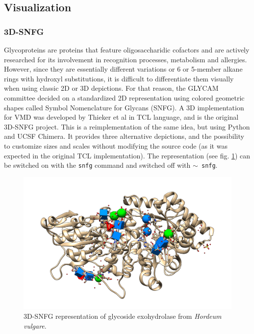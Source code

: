 \subsection{Visualization}
\subsubsection{3D-SNFG}
Glycoproteins are proteins that feature oligosaccharidic cofactors and are actively researched for its involvement in recognition processes, metabolism and allergies. However, since they are essentially different variations or 6 or 5-member alkane rings with hydroxyl  substitutions, it is difficult to differentiate them visually when using classic 2D or 3D depictions. For that reason, the GLYCAM committee decided on a standardized 2D representation using colored geometric shapes called Symbol Nomenclature for Glycans (SNFG).\cite{snfg} A 3D implementation for VMD was developed by Thieker et al\cite{3dsnfg} in TCL language, and is the original 3D-SNFG project. This is a reimplementation of the same idea, but using Python and UCSF Chimera. It provides three alternative depictions, and the possibility to customize sizes and scales without modifying the source code (as it was expected in the original TCL implementation). The representation (see fig. \ref{fig:tangram-snfg}) can be switched on with the \texttt{snfg} command and switched off with \texttt{$ \sim $ snfg}.

\begin{figure}[t]
	\begin{Center}
		\includegraphics[width=\textwidth]{./figures/05/tangram_snfg.png}
	\end{Center}
	\cprotect\caption[Tangram 3D-SNFG]{3D-SNFG representation of glycoside exohydrolase from \textit{Hordeum vulgare}.\cite{3wlh}}
	\label{fig:tangram-snfg}
\end{figure}


